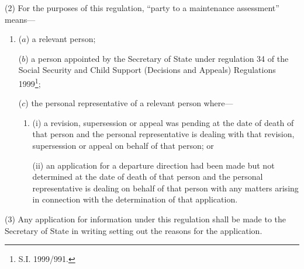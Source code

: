 \documentclass[a4paper,12pt]{article}
\begin{document}
(2) For the purposes of this regulation, “party to a maintenance assessment” means—
\begin{enumerate}\item[]
($a$) a relevant person;

($b$) a person appointed by the Secretary of State under regulation 
34 of the Social Security and Child Support (Decisions and Appeals) Regulations 1999\footnote{\frenchspacing S.I. 1999/991.};  %


($c$) the personal representative of a relevant person where—
\begin{enumerate}\item[]
(i) a 
revision, supersession  %
or appeal was pending at the date of death of that person and the personal representative is dealing with that 
revision, supersession  %
or appeal on behalf of that person; or

(ii) an application for a departure direction had been made but not determined at the date of death of that person and the personal representative is dealing 
on behalf of that person with any matters arising in connection with the determination of that application.  %
\end{enumerate}
\end{enumerate}

(3) Any application for information under this regulation shall be made to the Secretary of State 
in writing setting out the reasons for the application.
\end{document}
